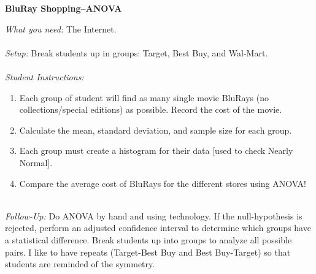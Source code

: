 \documentclass[12pt]{amsart}
\theoremstyle{definition}
\begin{document}
      \begin{framed}
      	\begin{center} \textbf{BluRay Shopping--ANOVA} \end{center}
      	\emph{What you need:} The Internet.\\
      	~\\
      	\emph{Setup:} Break students up in groups: Target, Best Buy, and Wal-Mart.\\
      	~\\
      	\emph{Student Instructions:} 
      	\begin{enumerate}
      		\item Each group of student will find as many single movie BluRays (no collections/special editions) as possible. Record the cost of the movie.
      		\item Calculate the mean, standard deviation, and sample size for each group.
      		\item Each group must create a histogram for their data [used to check Nearly Normal].
      		\item Compare the average cost of BluRays for the different stores using ANOVA!
      	\end{enumerate}
      	~\\
      	\emph{Follow-Up:} Do ANOVA by hand and using technology. If the null-hypothesis is rejected, perform an adjusted confidence interval to determine which groups have a statistical difference. Break students up into groups to analyze all possible pairs. I like to have repeats (Target-Best Buy and Best Buy-Target) so that students are reminded of the symmetry.
      \end{framed}
      \newpage
      
\end{document}
